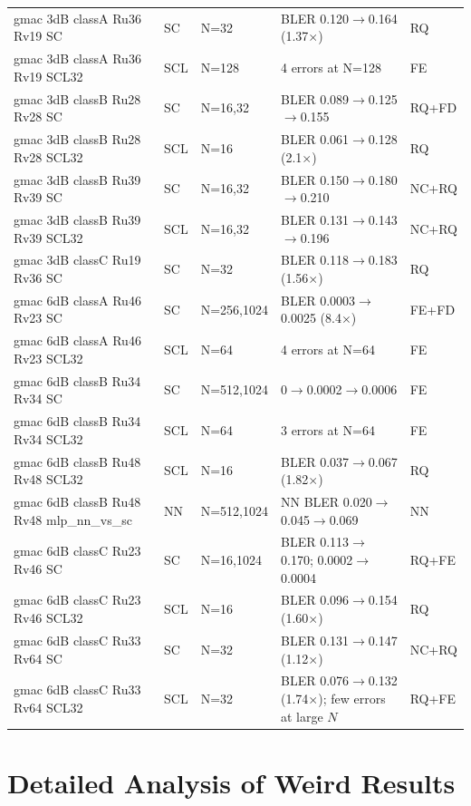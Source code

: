 \documentclass[11pt,a4paper]{article}
\begin{document}
\begin{landscape}
\begin{longtable}{p{5.5cm}llp{7cm}l}
gmac 3dB classA Ru36 Rv19 SC & SC & N=32 & BLER 0.120$\to$0.164 (1.37$\times$) & RQ \\
gmac 3dB classA Ru36 Rv19 SCL32 & SCL & N=128 & 4 errors at N=128 & FE \\
gmac 3dB classB Ru28 Rv28 SC & SC & N=16,32 & BLER 0.089$\to$0.125$\to$0.155 & RQ+FD \\
gmac 3dB classB Ru28 Rv28 SCL32 & SCL & N=16 & BLER 0.061$\to$0.128 (2.1$\times$) & RQ \\
gmac 3dB classB Ru39 Rv39 SC & SC & N=16,32 & BLER 0.150$\to$0.180$\to$0.210 & NC+RQ \\
gmac 3dB classB Ru39 Rv39 SCL32 & SCL & N=16,32 & BLER 0.131$\to$0.143$\to$0.196 & NC+RQ \\
gmac 3dB classC Ru19 Rv36 SC & SC & N=32 & BLER 0.118$\to$0.183 (1.56$\times$) & RQ \\
\midrule

gmac 6dB classA Ru46 Rv23 SC & SC & N=256,1024 & BLER 0.0003$\to$0.0025 (8.4$\times$) & FE+FD \\
gmac 6dB classA Ru46 Rv23 SCL32 & SCL & N=64 & 4 errors at N=64 & FE \\
gmac 6dB classB Ru34 Rv34 SC & SC & N=512,1024 & 0$\to$0.0002$\to$0.0006 & FE \\
gmac 6dB classB Ru34 Rv34 SCL32 & SCL & N=64 & 3 errors at N=64 & FE \\
gmac 6dB classB Ru48 Rv48 SCL32 & SCL & N=16 & BLER 0.037$\to$0.067 (1.82$\times$) & RQ \\
gmac 6dB classB Ru48 Rv48 mlp\_nn\_vs\_sc & NN & N=512,1024 & NN BLER 0.020$\to$0.045$\to$0.069 & NN \\
gmac 6dB classC Ru23 Rv46 SC & SC & N=16,1024 & BLER 0.113$\to$0.170; 0.0002$\to$0.0004 & RQ+FE \\
gmac 6dB classC Ru23 Rv46 SCL32 & SCL & N=16 & BLER 0.096$\to$0.154 (1.60$\times$) & RQ \\
gmac 6dB classC Ru33 Rv64 SC & SC & N=32 & BLER 0.131$\to$0.147 (1.12$\times$) & NC+RQ \\
gmac 6dB classC Ru33 Rv64 SCL32 & SCL & N=32 & BLER 0.076$\to$0.132 (1.74$\times$); few errors at large $N$ & RQ+FE \\

\bottomrule
\end{longtable}
\end{landscape}

\section{Detailed Analysis of Weird Results}
\end{document}
